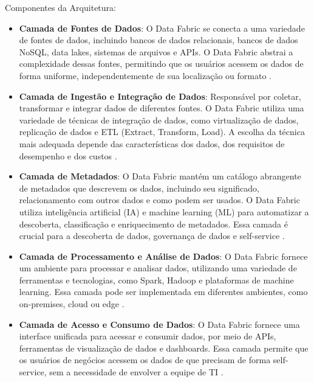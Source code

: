 Componentes da Arquitetura:
\begin{itemize}
    \item \textbf{Camada de Fontes de Dados}: O Data Fabric se conecta a uma variedade de fontes de dados, incluindo bancos de dados relacionais, bancos de dados NoSQL, data lakes, sistemas de arquivos e APIs. O Data Fabric abstrai a complexidade dessas fontes, permitindo que os usuários acessem os dados de forma uniforme, independentemente de sua localização ou formato \cite{barik2022data}.
    \item \textbf{Camada de Ingestão e Integração de Dados}: Responsável por coletar, transformar e integrar dados de diferentes fontes. O Data Fabric utiliza uma variedade de técnicas de integração de dados, como virtualização de dados, replicação de dados e ETL (Extract, Transform, Load). A escolha da técnica mais adequada depende das características dos dados, dos requisitos de desempenho e dos custos \cite{barik2022data}.
    \item \textbf{Camada de Metadados}: O Data Fabric mantém um catálogo abrangente de metadados que descrevem os dados, incluindo seu significado, relacionamento com outros dados e como podem ser usados. O Data Fabric utiliza inteligência artificial (IA) e machine learning (ML) para automatizar a descoberta, classificação e enriquecimento de metadados. Essa camada é crucial para a descoberta de dados, governança de dados e self-service \cite{barik2022data}.
    \item \textbf{Camada de Processamento e Análise de Dados}: O Data Fabric fornece um ambiente para processar e analisar dados, utilizando uma variedade de ferramentas e tecnologias, como Spark, Hadoop e plataformas de machine learning. Essa camada pode ser implementada em diferentes ambientes, como on-premises, cloud ou edge \cite{sharma2023data}.
    \item \textbf{Camada de Acesso e Consumo de Dados}: O Data Fabric fornece uma interface unificada para acessar e consumir dados, por meio de APIs, ferramentas de visualização de dados e dashboards. Essa camada permite que os usuários de negócios acessem os dados de que precisam de forma self-service, sem a necessidade de envolver a equipe de TI \cite{barik2022data}.
\end{itemize}

